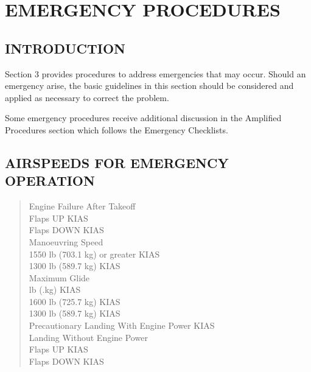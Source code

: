 \chapter{EMERGENCY PROCEDURES}
\vspace{\minitocspacebefore}
\minitoc
\cleardoublepage
\section{INTRODUCTION}
Section 3 provides procedures to address emergencies that may occur.   Should an emergency arise, the basic guidelines in this section should be considered and applied as necessary to correct the problem.

Some emergency procedures receive additional discussion in the Amplified Procedures section which follows the Emergency Checklists.

\section{AIRSPEEDS FOR EMERGENCY OPERATION}

\begin{quote}
Engine Failure After Takeoff\\
\newlength\emertab
\setlength\emertab{0.2in}
\hspace*{\emertab}Flaps UP KIAS\\
\hspace*{\emertab}Flaps DOWN KIAS\\
Manoeuvring Speed\\
\hspace*{\emertab}1550 lb (703.1 kg) or greater KIAS\\
\hspace*{\emertab}1300 lb (589.7 kg) KIAS\\
Maximum Glide\\
\hspace*{\emertab}\theMTOW \space lb (\theMTOWkg .\theMTOWkgdecimal \space kg) KIAS\\
\hspace*{\emertab}1600 lb (725.7 kg) KIAS\\
\hspace*{\emertab}1300 lb (589.7 kg) KIAS\\
Precautionary Landing With Engine Power KIAS\\
Landing Without Engine Power\\
\hspace*{\emertab}Flaps UP KIAS\\
\hspace*{\emertab}Flaps DOWN KIAS
\end{quote}

